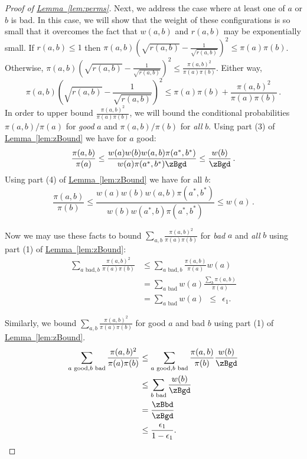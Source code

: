 \documentclass[11pt]{article}
\providecommand{\expref}[2]{\texorpdfstring{\hyperref[#2]{#1~\ref{#2}}}{#1~\ref{#2}}}
\begin{document}
\begin{proof}[Proof of \expref{Lemma}{lem:perms}]
Next, we address the case where at least one of $a$ or $b$ is bad.  In this case, we
will show that the weight of these configurations is so small that
it overcomes the fact that $w(a,b)$ and $r(a,b)$ may be exponentially small.  
If $r(a,b)\leq 1$ then
$\pi(a,b)\left(\sqrt{r(a,b)}-\frac{1}{\sqrt{r(a,b)}}\right)^2\leq
\pi(a)\pi(b)$.  Otherwise,
$\pi(a,b)\left(\sqrt{r(a,b)}-\frac{1}{\sqrt{r(a,b)}}\right)^2\leq
\frac{\pi(a,b)^2}{\pi(a)\pi(b)}.$  Either way,
\[\pi(a,b)\left(\sqrt{r(a,b)}-\frac{1}{\sqrt{r(a,b)}}\right)^2\leq
\pi(a)\pi(b) + \frac{\pi(a,b)^2}{\pi(a)\pi(b)}\,.\]
In order to upper bound $\frac{\pi(a,b)^2}{\pi(a)\pi(b)}$, we will
bound the conditional probabilities $\pi(a,b)/\pi(a)$ for \emph{good} 
$a$ and $\pi(a,b)/\pi(b)$ for \emph{all} $b$.  Using part (3) of \expref{Lemma}{lem:zBound} 
we have for $a$ good:
$$\frac{\pi(a,b)}{\pi(a)} \leq \frac{w(a)w(b)w(a,b)\pi(a^*,b^*)}{w(a)\pi(a^*,b^*)\zBgd} \leq \frac{w(b)}{\zBgd}\,.$$
Using part (4) of \expref{Lemma}{lem:zBound} we have for all $b$:
$$\frac{\pi(a,b)}{\pi(b)} \leq \frac{w(a)w(b)w(a,b)\pi(a^*,b^*)}{w(b)w(a^*,b)\pi(a^*,b^*)} \leq w(a)\,.$$
 
\noindent Now we may use these facts to bound $\sum_{a,b} 
\frac{\pi(a,b)^2}{\pi(a)\pi(b)}$ for \emph{bad} $a$ and \emph{all} $b$ 
using part (1) of \expref{Lemma}{lem:zBound}:
 \begin{align*}
   \sum_{a \text{ bad},b} \frac{\pi(a,b)^2}{\pi(a)\pi(b)}
      &\leq  \sum_{a \text{ bad},b} \frac{\pi(a,b)}{\pi(a)}w(a) \\ 
   &= \sum_{a \text{ bad}} w(a) \frac{ \sum_b \pi(a,b)}{\pi(a)} \\ 
 &= \sum_{a \text{ bad}} w(a)~~ \leq ~~\epsilon_1.
 \end{align*}
 
\noindent Similarly, we bound $\sum_{a,b} \frac{\pi(a,b)^2}{\pi(a)\pi(b)}$ 
for good $a$ and bad $b$ using part (1) of \expref{Lemma}{lem:zBound}.
  \begin{align*}
    \sum_{a \text{ good},b\text{ bad}} \frac{\pi(a,b)^2}{\pi(a)\pi(b)}
    &\leq \sum_{a \text{ good},b\text{ bad}}
    \frac{\pi(a,b)}{\pi(b)}\frac{w(b)}{\zBgd}\\
    &\leq \sum_{b\text{ bad}} \frac{w(b)}{\zBgd}\\
    &= \frac{\zBbd}{\zBgd}\\
    &\leq \frac{\epsilon_1}{1- \epsilon_1}.
 \end{align*}
 

\end{proof}
\end{document}
